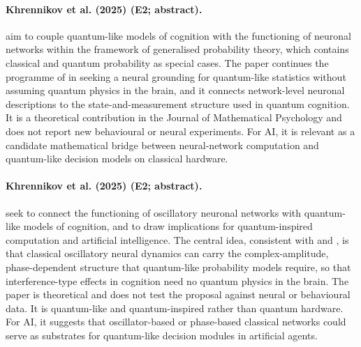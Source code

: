 \documentclass[10pt,a4paper]{article}
\begin{document}
\paragraph{Khrennikov et al. (2025) (E2; abstract).} \citet{Khrennikov2025a} aim to couple quantum-like models of cognition with the functioning of neuronal networks within the framework of generalised probability theory, which contains classical and quantum probability as special cases. The paper continues the programme of \citep{Khrennikov2018} in seeking a neural grounding for quantum-like statistics without assuming quantum physics in the brain, and it connects network-level neuronal descriptions to the state-and-measurement structure used in quantum cognition. It is a theoretical contribution in the Journal of Mathematical Psychology and does not report new behavioural or neural experiments. For AI, it is relevant as a candidate mathematical bridge between neural-network computation and quantum-like decision models on classical hardware.

\paragraph{Khrennikov et al. (2025) (E2; abstract).} \citet{Khrennikov2025b} seek to connect the functioning of oscillatory neuronal networks with quantum-like models of cognition, and to draw implications for quantum-inspired computation and artificial intelligence. The central idea, consistent with \citep{Busemeyer2017a} and \citep{Khrennikov2018}, is that classical oscillatory neural dynamics can carry the complex-amplitude, phase-dependent structure that quantum-like probability models require, so that interference-type effects in cognition need no quantum physics in the brain. The paper is theoretical and does not test the proposal against neural or behavioural data. It is quantum-like and quantum-inspired rather than quantum hardware. For AI, it suggests that oscillator-based or phase-based classical networks could serve as substrates for quantum-like decision modules in artificial agents.
\end{document}
